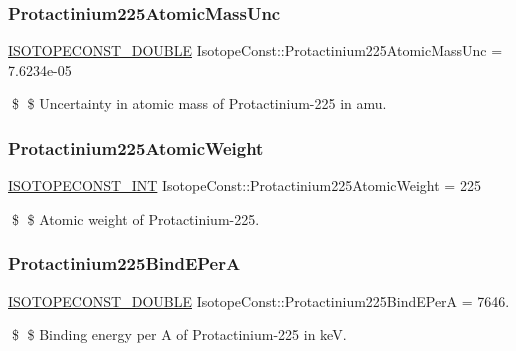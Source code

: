 \subsubsection{\texorpdfstring{Protactinium225\+Atomic\+Mass\+Unc}{Protactinium225AtomicMassUnc}}
{\footnotesize\ttfamily \mbox{\hyperlink{group___isotope_const-_macros_ga8f45a7272ce02c0b4c65c44636ed719a}{I\+S\+O\+T\+O\+P\+E\+C\+O\+N\+S\+T\+\_\+\+D\+O\+U\+B\+LE}} Isotope\+Const\+::\+Protactinium225\+Atomic\+Mass\+Unc = 7.\+6234e-\/05}

\$ \$ Uncertainty in atomic mass of Protactinium-\/225 in amu. \mbox{\label{group___isotope_const-_protactinium-_pa225_gaa08b614a0fcbaafb5208a43033da18df}} 
\subsubsection{\texorpdfstring{Protactinium225\+Atomic\+Weight}{Protactinium225AtomicWeight}}
{\footnotesize\ttfamily \mbox{\hyperlink{group___isotope_const-_macros_ga5f18360b3e99483a35c32d789e62621c}{I\+S\+O\+T\+O\+P\+E\+C\+O\+N\+S\+T\+\_\+\+I\+NT}} Isotope\+Const\+::\+Protactinium225\+Atomic\+Weight = 225}

\$ \$ Atomic weight of Protactinium-\/225. \mbox{\label{group___isotope_const-_protactinium-_pa225_gac4edceadadf8f9bb2c2249477c8260c8}} 
\subsubsection{\texorpdfstring{Protactinium225\+Bind\+E\+PerA}{Protactinium225BindEPerA}}
{\footnotesize\ttfamily \mbox{\hyperlink{group___isotope_const-_macros_ga8f45a7272ce02c0b4c65c44636ed719a}{I\+S\+O\+T\+O\+P\+E\+C\+O\+N\+S\+T\+\_\+\+D\+O\+U\+B\+LE}} Isotope\+Const\+::\+Protactinium225\+Bind\+E\+PerA = 7646.}

\$ \$ Binding energy per A of Protactinium-\/225 in keV. \mbox{\label{group___isotope_const-_protactinium-_pa225_ga29c3eb9cf0ed9f031efe16f49a5cf052}} 
